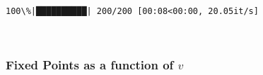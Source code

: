 \documentclass[11pt]{article}
\begin{document}
    \begin{Verbatim}[commandchars=\\\{\}]
100\%|██████████| 200/200 [00:08<00:00, 20.05it/s]
    \end{Verbatim}

    \begin{center}
    \end{center}
    { \hspace*{\fill} \\}
    
    \hypertarget{fixed-points-as-a-function-of-v}{%
\subsubsection{\texorpdfstring{Fixed Points as a function of
\(v\)}{Fixed Points as a function of v}}\label{fixed-points-as-a-function-of-v}}
\end{document}
